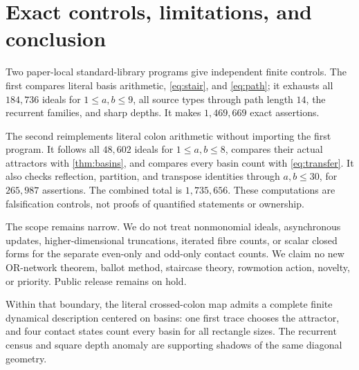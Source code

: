 \documentclass[10pt,a4paper]{amsart}
\theoremstyle{definition}
\theoremstyle{remark}
\begin{document}
\section{Exact controls, limitations, and conclusion}

Two paper-local standard-library programs give independent finite controls.
The first compares literal basis arithmetic, \eqref{eq:stair}, and
\eqref{eq:path}; it exhausts all \(184{,}736\) ideals for
\(1\leq a,b\leq9\), all source types through path length \(14\), the
recurrent families, and sharp depths.  It makes \(1{,}469{,}669\) exact
assertions.

The second reimplements literal colon arithmetic without importing the first
program.  It follows all \(48{,}602\) ideals for \(1\leq a,b\leq8\),
compares their actual attractors with \cref{thm:basins}, and compares every
basin count with \eqref{eq:transfer}.  It also checks reflection, partition,
and transpose identities through \(a,b\leq30\), for \(265{,}987\)
assertions.  The combined total is \(1{,}735{,}656\).  These computations
are falsification controls, not proofs of quantified statements or
ownership.

The scope remains narrow.  We do not treat nonmonomial ideals, asynchronous
updates, higher-dimensional truncations, iterated fibre counts, or scalar
closed forms for the separate even-only and odd-only contact counts.  We
claim no new OR-network theorem, ballot method, staircase theory, rowmotion
action, novelty, or priority.  Public release remains on hold.

Within that boundary, the literal crossed-colon map admits a complete finite
dynamical description centered on basins: one first trace chooses the
attractor, and four contact states count every basin for all rectangle sizes.
The recurrent census and square depth anomaly are supporting shadows of the
same diagonal geometry.



\end{document}
